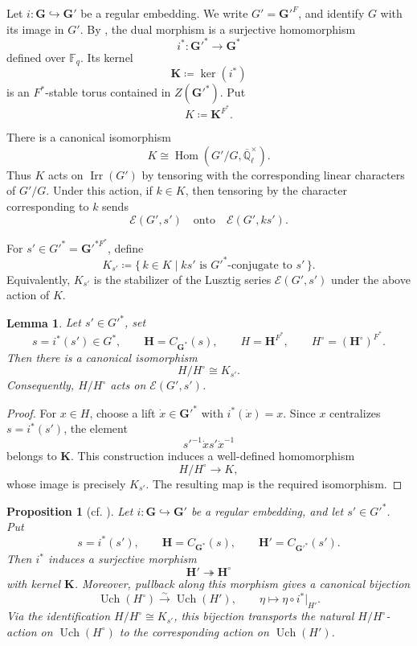 \documentclass{amsart}
\theoremstyle{plain}
\numberwithin{equation}{section}
\newtheorem{lemma}[theorem]{Lemma}
\newtheorem{proposition}[theorem]{Proposition}
\theoremstyle{definition}
\newcommand{\cE}{\mathcal{E}}
\newcommand{\Qlcl}{\overline{\mathbb{Q}}_{\ell}}
\newcommand{\Hom}{\operatorname{Hom}}
\newcommand{\Irr}{\operatorname{Irr}}
\newcommand{\fq}{\mathbb{F}_{q}}
\newcommand{\Uch}{\operatorname{Uch}}
\newcommand{\bG}{\mathbf{G}}
\newcommand{\bH}{\mathbf{H}}
\newcommand{\bK}{\mathbf{K}}
\begin{document}
Let \(i:\bG\hookrightarrow \bG'\) be a regular embedding.  We write
\(G'=\bG'^{F}\), and identify \(G\) with its image in \(G'\).  By
\cite[Theorem~1.7.12]{Book:GeckandMalle}, the dual morphism is a surjective
homomorphism
\[
i^*:\bG'^*\longrightarrow \bG^*
\]
defined over \(\fq\).  Its kernel
\[
\bK\coloneqq \ker(i^*)
\]
is an \(F^*\)-stable torus contained in \(Z(\bG'^*)\).  Put
\[
K\coloneqq \bK^{F^*}.
\]

There is a canonical isomorphism
\[
K \cong \Hom(G'/G,\Qlcl^\times).
\]
Thus \(K\) acts on \(\Irr(G')\) by tensoring with the corresponding linear
characters of \(G'/G\).  Under this action, if \(k\in K\), then tensoring by
the character corresponding to \(k\) sends
\[
\cE(G',s') \quad\text{onto}\quad \cE(G',ks').
\]

For \(s'\in G'^*=\bG'^{*F^*}\), define
\[
K_{s'}\coloneqq
\{\,k\in K\mid ks' \text{ is }G'^*\text{-conjugate to }s'\,\}.
\]
Equivalently, \(K_{s'}\) is the stabilizer of the Lusztig series
\(\cE(G',s')\) under the above action of \(K\).

\begin{lemma}\label{lem:H-component-group}
Let \(s'\in G'^*\), set
\[
s=i^*(s')\in G^*,
\qquad
\bH=C_{\bG^*}(s),
\qquad
H=\bH^{F^*},
\qquad
H^\circ=(\bH^\circ)^{F^*}.
\]
Then there is a canonical isomorphism
\[
H/H^\circ \cong K_{s'}.
\]
Consequently, \(H/H^\circ\) acts on \(\cE(G',s')\).
\end{lemma}

\begin{proof}
For \(x\in H\), choose a lift \(\dot{x}\in \bG'^*\) with
\(i^*(\dot{x})=x\).  Since \(x\) centralizes \(s=i^*(s')\), the element
\[
s'^{-1}\dot{x}s'\dot{x}^{-1}
\]
belongs to \(\bK\).  This construction induces a well-defined homomorphism
\[
H/H^\circ\longrightarrow K,
\]
whose image is precisely \(K_{s'}\).  The resulting map is the required
isomorphism.
\end{proof}

\begin{proposition}[{cf. \cite[Proposition~2.3.15]{Book:GeckandMalle}}]
\label{prop:H-action-on-unipotent-characters}
Let \(i:\bG\hookrightarrow \bG'\) be a regular embedding, and let
\(s'\in G'^*\).  Put
\[
s=i^*(s'),
\qquad
\bH=C_{\bG^*}(s),
\qquad
\bH'=C_{\bG'^*}(s').
\]
Then \(i^*\) induces a surjective morphism
\[
\bH'\twoheadrightarrow \bH^\circ
\]
with kernel \(\bK\).  Moreover, pullback along this morphism gives a canonical
bijection
\[
\Uch(H^\circ)\xrightarrow{\sim}\Uch(H'),
\qquad
\eta\longmapsto \eta\circ i^*|_{H'}.
\]
Via the identification \(H/H^\circ\cong K_{s'}\), this bijection transports the
natural \(H/H^\circ\)-action on \(\Uch(H^\circ)\) to the corresponding action
on \(\Uch(H')\).
\end{proposition}
\end{document}
